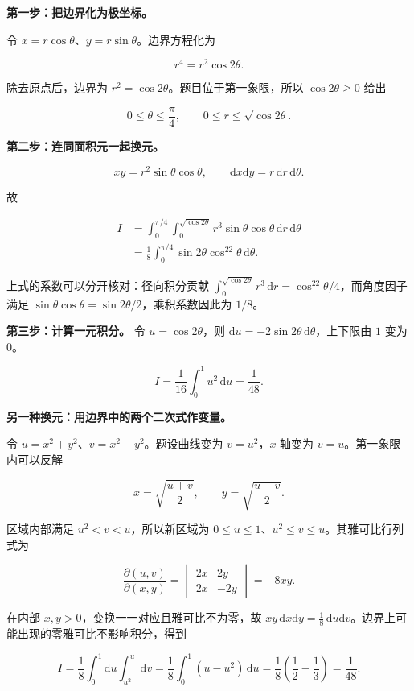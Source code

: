 \documentclass[UTF8,11pt,fontset=windows]{ctexart}
\begin{document}
\textbf{第一步：把边界化为极坐标。}

令 $x=r\cos\theta$、$y=r\sin\theta$。边界方程化为

$$
r^4=r^2\cos2\theta.
$$

除去原点后，边界为 $r^2=\cos2\theta$。题目位于第一象限，所以 $\cos2\theta\ge0$ 给出

$$
0\le\theta\le\frac\pi4,
\qquad0\le r\le\sqrt{\cos2\theta}.
$$

\textbf{第二步：连同面积元一起换元。}

$$
xy=r^2\sin\theta\cos\theta,
\qquad \mathrm dx\mathrm dy=r\,\mathrm dr\,\mathrm d\theta.
$$

故

$$
\begin{aligned}
I&=\int_0^{\pi/4}\int_0^{\sqrt{\cos2\theta}}
 r^3\sin\theta\cos\theta\,\mathrm dr\,\mathrm d\theta\\
&=\frac18\int_0^{\pi/4}\sin2\theta\cos^22\theta\,\mathrm d\theta.
\end{aligned}
$$

上式的系数可以分开核对：径向积分贡献 $\int_0^{\sqrt{\cos2\theta}}r^3\,\mathrm dr=\cos^22\theta/4$，而角度因子满足 $\sin\theta\cos\theta=\sin2\theta/2$，乘积系数因此为 $1/8$。

\textbf{第三步：计算一元积分。} 令 $u=\cos2\theta$，则 $\mathrm du=-2\sin2\theta\,\mathrm d\theta$，上下限由 $1$ 变为 $0$。

$$
I=\frac1{16}\int_0^1u^2\,\mathrm du=\frac1{48}.
$$

\textbf{另一种换元：用边界中的两个二次式作变量。}

令 $u=x^2+y^2$、$v=x^2-y^2$。题设曲线变为 $v=u^2$，$x$ 轴变为 $v=u$。第一象限内可以反解

$$
x=\sqrt{\frac{u+v}{2}},
\qquad y=\sqrt{\frac{u-v}{2}}.
$$

区域内部满足 $u^2<v<u$，所以新区域为 $0\le u\le1$、$u^2\le v\le u$。其雅可比行列式为

$$
\frac{\partial(u,v)}{\partial(x,y)}
=\begin{vmatrix}2x&2y\\2x&-2y\end{vmatrix}=-8xy.
$$

在内部 $x,y>0$，变换一一对应且雅可比不为零，故 $xy\,\mathrm dx\mathrm dy=\tfrac18\,\mathrm du\mathrm dv$。边界上可能出现的零雅可比不影响积分，得到

$$
I=\frac18\int_0^1\mathrm du\int_{u^2}^{u}\mathrm dv
=\frac18\int_0^1(u-u^2)\,\mathrm du
=\frac18\left(\frac12-\frac13\right)=\frac1{48}.
$$
\end{document}
